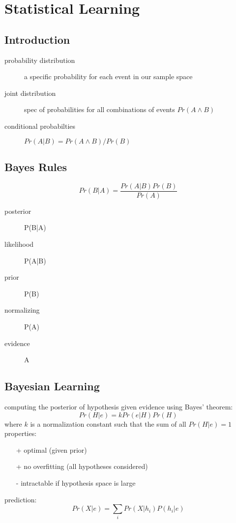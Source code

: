 \documentclass[]{article}
\theoremstyle{definition}
\begin{document}
    
    \section{Statistical Learning}
    \label{sec:statistical_learning}

    \subsection{Introduction}

    \begin{description}
        \item[probability distribution] a specific probability for each event in our sample space
        \item[joint distribution] spec of probabilities for all combinations of events $Pr(A \wedge B)$
        \item[conditional probabilties] $Pr(A|B) = Pr(A \wedge B) / Pr(B)$
    \end{description}

    \subsection{Bayes Rules}
    \label{sub:bayes_ruless}
    
    \begin{equation*}
        Pr(B|A) = \frac{Pr(A|B)Pr(B)}{Pr(A)}
    \end{equation*}
    \begin{description}
        \item[posterior] P(B|A)
        \item[likelihood] P(A|B)
        \item[prior] P(B)
        \item[normalizing] P(A)
        \item[evidence] A
    \end{description}

    \subsection{Bayesian Learning}
    \label{sub:bayesian_learning}

    computing the posterior of hypothesis given evidence using Bayes' theorem:
    \begin{equation*}
        Pr(H|e) = k Pr(e|H) Pr(H)
    \end{equation*}
    where $k$ is a normalization constant such that the sum of all $Pr(H | e) = 1$ \\
    properties:
    \begin{itemize}
        \item[+] optimal (given prior)
        \item[+] no overfitting (all hypotheses considered)
        \item[-] intractable if hypothesis space is large
    \end{itemize}
    prediction:
    \begin{equation*}
        Pr(X|e) = \sum_i Pr(X|h_i) P(h_i|e)
    \end{equation*}
    
\end{document}
